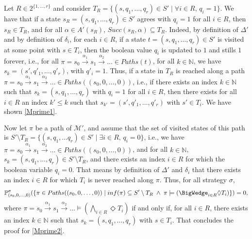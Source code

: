 \begin{proof2}
  Let $R \in 2^{\{1, \dots, r\}}$ and consider $T_R = \{ (s, q_1, \dots, q_r) \in S' \; | \; \forall i \in R, \, q_i = 1 \}$.
  We have that if a state $s_R = (s, q_1, \dots, q_r) \in S'$ agrees with $q_i = 1$ for all $i \in R$, then $s_R \in T_R$, and for all $\alpha \in A'(s_R)$, $Succ(s_R, \alpha) \subseteq  T_R$.
  Indeed, by definition of $\Delta'$ and by definition of $\delta_i$, for each $i \in R$, if a state $t=(s, q_1, \dots, q_r) \in S'$ is visited at some point with $s \in T_i$, then the boolean value $q_i$ is updated to $1$ and stills $1$ forever, i.e., for all $\pi=s_0 \xrightarrow{\alpha_1} s_1 \xrightarrow{\alpha_2}\dots \in Paths(t)$, for all $k \in \mathbb{N}$,
  we have $s_k = (s', q'_1, \dots, q'_r)$, with $q'_i =1$.
  Thus, if a state in $T_R$ is reached along a path $\pi=s_0 \xrightarrow{\alpha_1} s_1 \xrightarrow{\alpha_2}\dots \in Paths((s_0, 0, \dots, 0))$, i.e., if there exists an index $k \in \mathbb{N}$ such that $s_k = (s, q_1, \dots, q_r)$ with $q_i = 1$ for all $i \in R$, then there exists for all $i \in R$ an index $k' \leq k$ such that $s_{k'} = (s', q'_1, \dots, q'_r)$
  with $s' \in T_i$. We have shown \ref{Mprime1}.
  \par Now let $\pi$ be a path of $\mathcal{M}'$, and assume that the set of visited states of this path is $S' \setminus T_R = \{(s, q_1, \dots q_r) \in S' \; | \; \exists i \in R, \, q_i = 0 \}$, i.e., we have $\pi = s_0 \xrightarrow{\alpha_1}s_1 \xrightarrow{\alpha_2} \dots \in Paths((s_0, 0, \dots, 0))$, and for all $k \in \mathbb{N}$, $s_k = (s, q_1, \dots, q_r) \in S' \setminus T_R$, and there exists an index $i \in R$ for which the boolean variable $q_i = 0$.
  That means by definition of $\Delta'$ and $\delta_i$ that there exists an index $i \in R$ for which $T_i$ is never reached along $\pi$.
  Thus, for all strategy $\sigma$, \[\mathbb{P}^\sigma_{(s_0, 0, \dots, 0)}(\{ \pi \in Paths((s_0, 0, \dots, 0)) \; | \; inf(\pi) \subseteq S' \setminus T_R \; \wedge \; \pi \models (\BigWedge_{i \in R} \Diamond T_i) \})= 0,\]
  where $\pi=s_0
  \xrightarrow{\alpha_1}s_1\xrightarrow{\alpha_2}
  \dots \models (\bigwedge_{i \in R} \Diamond T_i)$
  if and only if, for all $i \in R$, there exists an
  index $k \in \mathbb{N}$ such that $s_k = (s, q_1,
  \dots, q_r)$ with $s \in T_i$. That concludes the proof for \ref{Mprime2}.\flushright
  \end{proof2}

